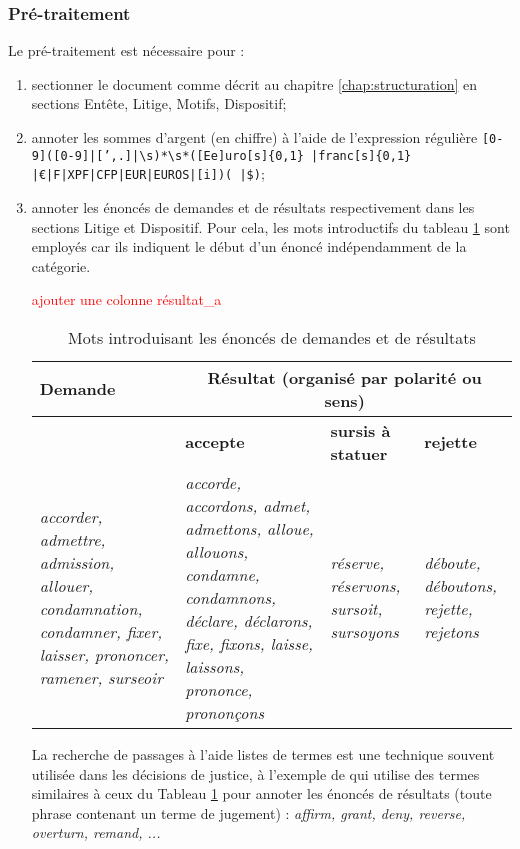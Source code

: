 \subsubsection{Pré-traitement}

Le pré-traitement est nécessaire pour :
\begin{enumerate}
	\item sectionner le document comme décrit au chapitre \ref{chap:structuration} en sections Entête, Litige, Motifs, Dispositif;
	\item annoter les sommes d'argent (en chiffre) à l'aide de l'expression régulière \og \texttt{[0-9]([0-9]|[',.]|\textbackslash s)*\textbackslash s*([Ee]uro[s]\{0,1\} |franc[s]\{0,1\} \\ |\euro|F|XPF|CFP|EUR|EUROS|[i])( |\$)}\fg{};
	\item annoter les énoncés de demandes et de résultats respectivement dans les sections Litige et Dispositif. Pour cela, les mots introductifs du tableau \ref{tab:quanta:mots-introductifs} sont employés car ils indiquent le début d'un énoncé indépendamment de la catégorie.
	 
	\begin{table}[!htb]
		\centering
		\scriptsize
		\textcolor{red}{ajouter une colonne résultat\_a}
		\begin{tabular}{|p{}|p{}|p{}|p{}|}
			\hline
			\textbf{Demande} & \multicolumn{3}{c|}{\textbf{Résultat} (organisé par polarité ou sens)} \\ \hline
			& \textbf{accepte}  &\textbf{sursis à statuer} & \textbf{rejette}  \\ \hline
			\textit{accorder, admettre, admission, allouer, condamnation, condamner, fixer, laisser, prononcer, ramener, surseoir} & \textit{accorde, accordons, admet, admettons, alloue, allouons, condamne, condamnons, déclare, déclarons, fixe, fixons, laisse, laissons, prononce, prononçons} & \textit{réserve, réservons, sursoit, sursoyons} & \textit{déboute, déboutons, rejette, rejetons} \\ \hline
		\end{tabular}
		\caption{Mots introduisant les énoncés de demandes et de résultats}\label{tab:quanta:mots-introductifs}
	\end{table}

	La recherche de passages à l'aide listes de termes est une technique souvent utilisée dans les décisions de justice, à l'exemple de \cite{wyner2010extractlegalelts} qui utilise des termes similaires à ceux du Tableau \ref{tab:quanta:mots-introductifs} pour annoter les énoncés de résultats (toute phrase contenant un terme de jugement) : \textit{affirm, grant, deny, reverse, overturn, remand, ...}
\end{enumerate} 


